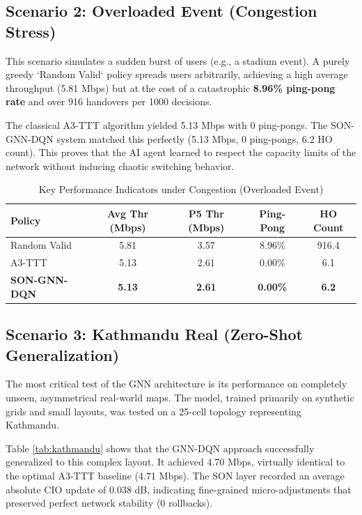 \documentclass[12pt,a4paper,oneside]{report}
\begin{document}
\subsection{Scenario 2: Overloaded Event (Congestion Stress)}
This scenario simulates a sudden burst of users (e.g., a stadium event). A purely greedy `Random Valid` policy spreads users arbitrarily, achieving a high average throughput (5.81 Mbps) but at the cost of a catastrophic \textbf{8.96\% ping-pong rate} and over 916 handovers per 1000 decisions.

The classical A3-TTT algorithm yielded 5.13 Mbps with 0 ping-pongs. The SON-GNN-DQN system matched this perfectly (5.13 Mbps, 0 ping-pongs, 6.2 HO count). This proves that the AI agent learned to respect the capacity limits of the network without inducing chaotic switching behavior. 

\begin{table}[htbp]
\centering
\caption{Key Performance Indicators under Congestion (Overloaded Event)}
\label{tab:overload}
\begin{tabular}{@{}lcccc@{}}
\toprule
\textbf{Policy} & \textbf{Avg Thr (Mbps)} & \textbf{P5 Thr (Mbps)} & \textbf{Ping-Pong} & \textbf{HO Count} \\ \midrule
Random Valid & 5.81 & 3.57 & 8.96\% & 916.4 \\
A3-TTT & 5.13 & 2.61 & 0.00\% & 6.1 \\
\textbf{SON-GNN-DQN} & \textbf{5.13} & \textbf{2.61} & \textbf{0.00\%} & \textbf{6.2} \\ \bottomrule
\end{tabular}
\end{table}

\subsection{Scenario 3: Kathmandu Real (Zero-Shot Generalization)}
The most critical test of the GNN architecture is its performance on completely unseen, asymmetrical real-world maps. The model, trained primarily on synthetic grids and small layouts, was tested on a 25-cell topology representing Kathmandu.

Table \ref{tab:kathmandu} shows that the GNN-DQN approach successfully generalized to this complex layout. It achieved 4.70 Mbps, virtually identical to the optimal A3-TTT baseline (4.71 Mbps). The SON layer recorded an average absolute CIO update of 0.038 dB, indicating fine-grained micro-adjustments that preserved perfect network stability (0 rollbacks).
\end{document}
